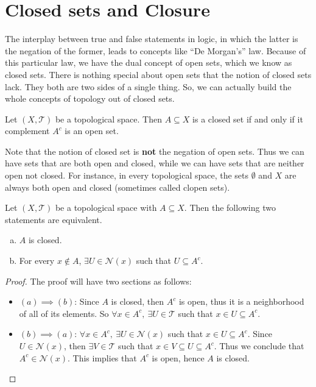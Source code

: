 \section{Closed sets and Closure}
The interplay between true and false statements in logic, in which the latter is the negation of the former, leads to concepts like ``De Morgan's'' law. Because of this particular law, we have the dual concept of open sets, which we know as closed sets. There is nothing special about open sets that the notion of closed sets lack. They both are two sides of a single thing. So, we can actually build the whole concepts of topology out of closed sets.

\begin{defbox}
	Let $(X,\mathcal{T})$ be a topological space. Then $A \subseteq X$ is a closed set if and only if it complement $A^c$ is an open set. 
\end{defbox}

Note that the notion of closed set is \textbf{not} the negation of open sets. Thus we can have sets that are both open and closed, while we can have sets that are neither open not closed. For instance, in every topological space, the sets $\emptyset$ and $X$ are always both open and closed (sometimes called clopen sets).

\begin{lembox}{}
	Let $(X,\mathcal{T})$ be a topological space with $A \subseteq X$. Then the following two statements are equivalent.
	\begin{enumerate}[(a)]
		\item $A$ is closed.
		\item For every $x \notin A$, $\exists U \in \mathcal{N}(x)$ such that $U \subseteq A^c$.
	\end{enumerate}
\end{lembox}
\begin{proof}
	The proof will have two sections as follows:
	\begin{itemize}
		\item $(a) \implies (b)$: Since $A$ is closed, then $A^c$ is open, thus it is a neighborhood of all of its elements. So $\forall x\in A^c,\ \exists U \in \mathcal{T}$ such that $x \in U \subseteq A^c$.
		\item $(b) \implies (a)$: $\forall x \in A^c,\ \exists U \in \mathcal{N}(x)$ such that $x\in U \subseteq A^c$. Since $U \in \mathcal{N}(x)$, then $\exists V \in \mathcal{T}$ such that $x\in V \subseteq U \subseteq A^c$. Thus we conclude that $A^c \in \mathcal{N}(x)$. This implies that $A^c$ is open, hence $A$ is closed. 
	\end{itemize}
\end{proof}

